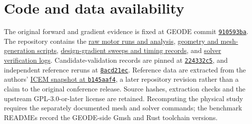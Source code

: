\documentclass{anvil-paper}
\begin{document}
\section*{Code and data availability}
The original forward and gradient evidence is fixed at GEODE commit
\href{https://github.com/rjwalters/geode-fem/tree/910593bad6f64f9f01671c2632b57034e72b9c61}{\texttt{910593ba}}.
The repository contains the
\href{https://github.com/rjwalters/geode-fem/tree/910593bad6f64f9f01671c2632b57034e72b9c61/benchmarks/motor_reference/forward_harmonic}{raw motor runs and analysis},
\href{https://github.com/rjwalters/geode-fem/tree/910593bad6f64f9f01671c2632b57034e72b9c61/benchmarks/motor_reference/geometry}{geometry and mesh-generation scripts},
\href{https://github.com/rjwalters/geode-fem/tree/910593bad6f64f9f01671c2632b57034e72b9c61/benchmarks/motor_shape_gradient/design}{design-gradient sweeps and timing records},
and \href{https://github.com/rjwalters/geode-fem/tree/910593bad6f64f9f01671c2632b57034e72b9c61/benchmarks/motor_nonlinear_m1}{solver verification logs}.
Candidate-validation records are pinned at
\href{https://github.com/rjwalters/geode-fem/tree/224332c526be1191183af82b610973c7778de720/benchmarks/motor_validation}{\texttt{224332c5}},
and independent reference reruns at
\href{https://github.com/rjwalters/geode-fem/tree/8acd21ecf85d89fe077275a3c04ca70b53963d43/benchmarks/motor_reference/reference_refinement}{\texttt{8acd21ec}}.
Reference data are extracted from the authors'
\href{https://github.com/MichaelWiesheu/ICEMsnapshot/tree/b145aaf4ab1a6424828bc941eaf172f48fa0d458}{ICEM snapshot at \texttt{b145aaf4}},
a later repository revision rather than a claim to the original conference
release. Source hashes, extraction checks and the upstream GPL-3.0-or-later license
are retained. Recomputing the physical study requires the separately
documented mesh and solver commands; the benchmark READMEs record the
GEODE-side Gmsh and Rust toolchain versions.
\end{document}
